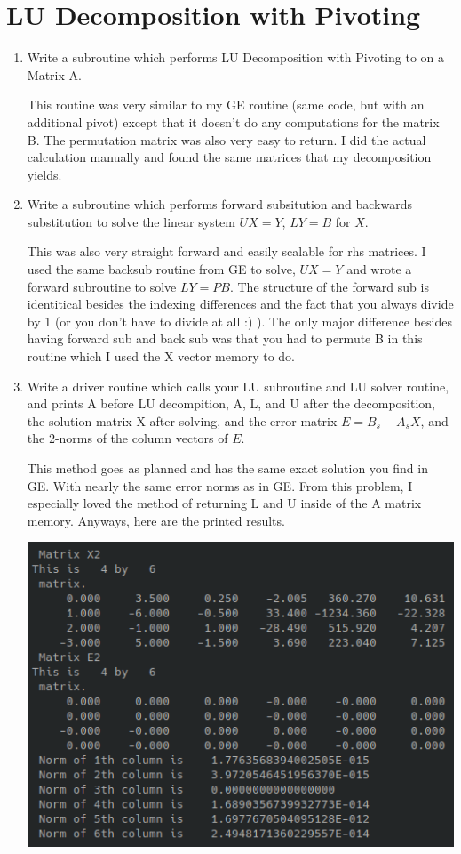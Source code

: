 \documentclass{article}
\begin{document}
\section{LU Decomposition with Pivoting}
\begin{enumerate}
\item Write a subroutine which performs LU Decomposition with Pivoting to on a Matrix A. 

This routine was very similar to my GE routine (same code, but with an additional pivot) except that it doesn't do any computations for the matrix B. The permutation matrix was also very easy to return. I did the actual calculation manually and found the same matrices that my decomposition yields.

\item Write a subroutine which performs forward subsitution and backwards substitution to solve the linear system $UX = Y$, $LY = B$ for $X$. 

This was also very straight forward and easily scalable for rhs matrices. I used the same backsub routine from GE to solve, $UX = Y$ and wrote a forward subroutine to solve $LY = PB$. The structure of the forward sub is identitical besides the indexing differences and the fact that you always divide by 1 (or you don't have to divide at all :) ). The only major difference besides having forward sub and back sub was that you had to permute B in this routine which I used the X vector memory to do. 

\item Write a driver routine which calls your LU subroutine and LU solver routine, and prints A before LU decompition, A, L, and U after the decomposition, the solution matrix X after solving, and the error matrix $E = B_s - A_sX$, and the 2-norms of the column vectors of $E$. 

This method goes as planned and has the same exact solution you find in GE. With nearly the same error norms as in GE. From this problem, I especially loved the method of returning L and U inside of the A matrix memory. Anyways, here are the printed results.  

\begin{center}
    \includegraphics[width = .6\textwidth]{files/LUsol.png}
\end{center}

\end{enumerate}
\end{document}
